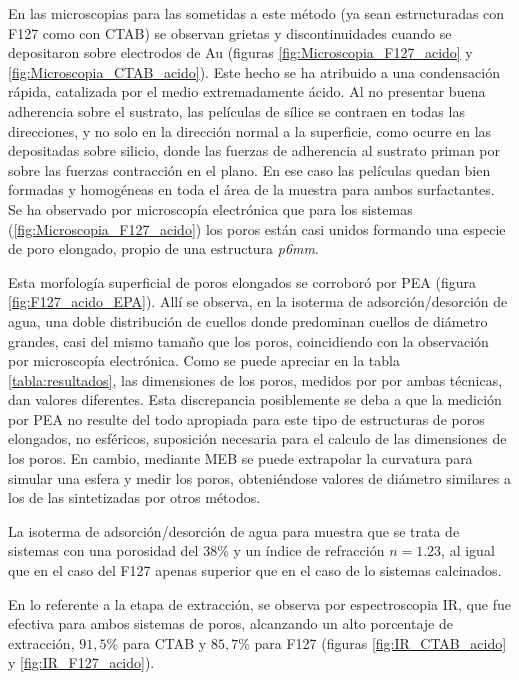 		 En las microscopias para las \pdm\space sometidas a este método (ya sean estructuradas con F127 como con CTAB) se observan grietas y discontinuidades cuando se depositaron sobre electrodos de Au (figuras \ref{fig:Microscopia_F127_acido} y \ref{fig:Microscopia_CTAB_acido}). Este hecho se ha atribuido a una condensación rápida, catalizada por el medio extremadamente ácido. Al no presentar buena adherencia sobre el sustrato, las películas de sílice se contraen en todas las direcciones, y no solo en la dirección normal a la superficie, como ocurre en las \pdm\space depositadas sobre silicio, donde las fuerzas de adherencia al sustrato priman por sobre las fuerzas contracción en el plano\cite{Sakatani2006,Boissiere2005,Guillemin2010}. En ese caso las películas quedan bien formadas y homogéneas en toda el área de la muestra para ambos surfactantes. Se ha observado por microscopía electrónica que para los sistemas \pdmF\space (\ref{fig:Microscopia_F127_acido}) los  poros están casi unidos formando una especie de poro elongado, propio de una estructura \textit{p6mm}\cite{GonzalezSolveyra2017}. 
	
		 Esta morfología superficial de poros elongados se corroboró por PEA (figura \ref{fig:F127_acido_EPA}). Allí se observa, en la isoterma de adsorción/desorción de agua, una doble distribución de cuellos donde predominan cuellos de diámetro grandes, casi del mismo tamaño que los poros, coincidiendo con la observación por microscopía electrónica.
		 Como se puede apreciar en la tabla \ref{tabla:resultados}, las dimensiones de los poros, medidos por por ambas técnicas, dan valores diferentes. Esta discrepancia posiblemente se deba a que la medición por PEA no resulte del todo apropiada para este tipo de estructuras de poros elongados, no esféricos, suposición necesaria para el calculo de las dimensiones de los poros. En cambio, mediante MEB se puede extrapolar la curvatura para simular una esfera y medir los poros, obteniéndose valores de diámetro similares a los de las \pdmF sintetizadas por otros métodos.

		 La isoterma de adsorción/desorción de agua para \pdmC\space muestra que se trata de sistemas con una porosidad del 38\% y un índice de refracción $n=1.23$, al igual que en el caso del F127 apenas superior que en el caso de lo sistemas calcinados.
		
		 En lo referente a la etapa de extracción, se observa por espectroscopia IR, que fue efectiva para ambos sistemas de poros, alcanzando un alto porcentaje de extracción, $91,5$\% para CTAB y $85,7$\% para F127 (figuras \ref{fig:IR_CTAB_acido} y \ref{fig:IR_F127_acido}).  	
				
